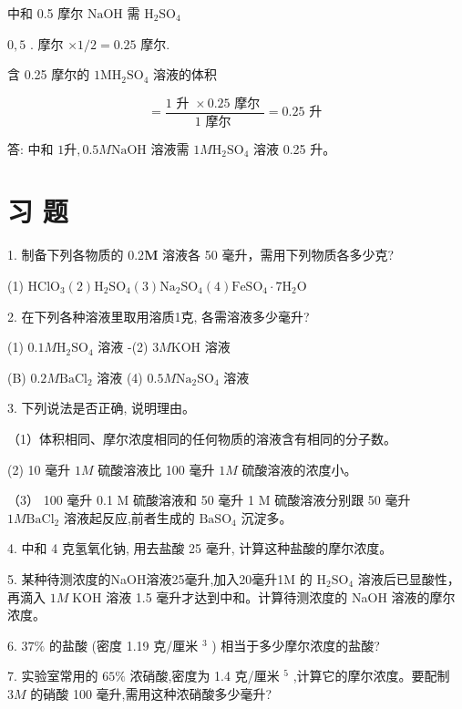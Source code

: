 \documentclass[10pt]{article}
\begin{document}
中和 0.5 摩尔 \(\mathrm{{NaOH}}\) 需 \({\mathrm{H}}_{2}{\mathrm{{SO}}}_{4}\)

\(0,5\) . 摩尔 \(\times 1/2 = {0.25}\) 摩尔.

含 0.25 摩尔的 \(1{\mathrm{{MH}}}_{2}{\mathrm{{SO}}}_{4}\) 溶液的体积

\[
= \frac{1\text{ 升 } \times {0.25}\text{ 摩尔 }}{1\text{ 摩尔 }} = {0.25}\text{ 升 }
\]

答: 中和 \(1\mathrm{升},{0.5M}\mathrm{{NaOH}}\) 溶液需 \({1M}{\mathrm{H}}_{2}{\mathrm{{SO}}}_{4}\) 溶液 0.25 升。

\section*{习 题}

1. 制备下列各物质的 \({0.2}\mathbf{M}\) 溶液各 50 毫升，需用下列物质各多少克?

(1) \({\mathrm{{HClO}}}_{3}\left( 2\right) {\mathrm{H}}_{2}{\mathrm{{SO}}}_{4}\left( 3\right) {\mathrm{{Na}}}_{2}{\mathrm{{SO}}}_{4}\left( 4\right) {\mathrm{{FeSO}}}_{4} \cdot 7{\mathrm{H}}_{2}\mathrm{O}\)

2. 在下列各种溶液里取用溶质1克, 各需溶液多少毫升?

(1) \({0.1M}{\mathrm{H}}_{2}{\mathrm{{SO}}}_{4}\) 溶液 -(2) \({3M}\mathrm{{KOH}}\) 溶液

(B) \({0.2M}{\mathrm{{BaCl}}}_{2}\) 溶液 (4) \({0.5M}{\mathrm{{Na}}}_{2}{\mathrm{{SO}}}_{4}\) 溶液

3. 下列说法是否正确, 说明理由。

（1）体积相同、摩尔浓度相同的任何物质的溶液含有相同的分子数。

(2) 10 毫升 \({1M}\) 硫酸溶液比 100 毫升 \({1M}\) 硫酸溶液的浓度小。

（3） 100 毫升 0.1 M 硫酸溶液和 50 毫升 1 M 硫酸溶液分别跟 50 毫升 \({1M}{\mathrm{{BaCl}}}_{2}\) 溶液起反应,前者生成的 \({\mathrm{{BaSO}}}_{4}\) 沉淀多。

4. 中和 4 克氢氧化钠, 用去盐酸 25 毫升, 计算这种盐酸的摩尔浓度。

5. 某种待测浓度的NaOH溶液25毫升,加入20毫升1M 的 \({\mathrm{H}}_{2}{\mathrm{{SO}}}_{4}\) 溶液后已显酸性，再滴入 \({1M}\;\mathrm{{KOH}}\) 溶液 1.5 毫升才达到中和。计算待测浓度的 NaOH 溶液的摩尔浓度。

6. \({37}\%\) 的盐酸 (密度 1.19 克/厘米 \({}^{3}\) ) 相当于多少摩尔浓度的盐酸?

7. 实验室常用的 \({65}\%\) 浓硝酸,密度为 1.4 克/厘米 \({}^{5}\) ,计算它的摩尔浓度。要配制 \({3M}\) 的硝酸 100 毫升,需用这种浓硝酸多少毫升?
\end{document}

